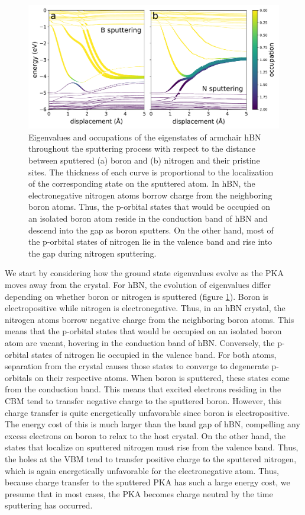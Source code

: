 \documentclass{article}
\begin{document}
\begin{figure}
  \centering
  \includegraphics[width=\textwidth]{figures/eigenvals_overlap.pdf}
  \caption{
    Eigenvalues and occupations of the eigenstates of armchair hBN throughout
    the sputtering process with respect to the distance between sputtered (a)
    boron and (b) nitrogen and their pristine sites.
    The thickness of each curve is proportional to the localization of the
    corresponding state on the sputtered atom.
    In hBN, the electronegative nitrogen atoms borrow charge from the
    neighboring boron atoms.
    Thus, the p-orbital states that would be occupied on an isolated boron atom
    reside in the conduction band of hBN and descend into the gap as boron
    sputters.
    On the other hand, most of the p-orbital states of nitrogen lie in the
    valence band and rise into the gap during nitrogen sputtering.
  }
  \label{fig:eigenvals}
\end{figure}

We start by considering how the ground state eigenvalues evolve as the PKA
moves away from the crystal.  For hBN, the evolution of eigenvalues differ
depending on whether boron or nitrogen is sputtered (figure
\ref{fig:eigenvals}).  Boron is electropositive while nitrogen is
electronegative.  Thus, in an hBN crystal, the nitrogen atoms borrow negative
charge from the neighboring boron atoms.  This means that the p-orbital states
that would be occupied on an isolated boron atom are vacant, hovering in
the conduction band of hBN.  Conversely, the p-orbital states of nitrogen lie
occupied in the valence band.
For both atoms, separation from the crystal causes those states to converge to
degenerate p-orbitals on their respective atoms.
When boron is sputtered, these states come from the conduction band.
This means that excited electrons residing in the CBM tend to transfer
negative charge to the sputtered boron.  However, this charge transfer is quite
energetically unfavorable since boron is electropositive. The energy cost of
this is much larger than the band gap of hBN, compelling any excess electrons
on boron to relax to the host crystal. On the other hand, the states that
localize on sputtered nitrogen must rise from the valence band.
Thus, the holes at the VBM tend to transfer positive charge to the sputtered
nitrogen, which is again energetically unfavorable for the electronegative
atom.
Thus, because charge transfer to the sputtered PKA has such a large energy
cost, we presume that in most cases, the PKA becomes charge neutral by the time
sputtering has occurred.
\end{document}
